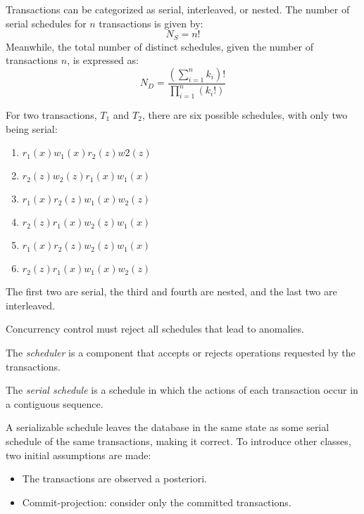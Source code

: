 Transactions can be categorized as serial, interleaved, or nested. 
The number of serial schedules for $n$ transactions is given by:
\[N_S=n!\]
Meanwhile, the total number of distinct schedules, given the number of transactions $n$, is expressed as:
\[N_D=\dfrac{\left( \sum_{i=1}^nk_i \right)!}{\prod_{i=1}^n \left( k_i! \right)}\]
\begin{example}
    For two transactions, $T_1$ and $T_2$, there are six possible schedules, with only two being serial:
    \begin{enumerate}
        \item $r_1(x) w_1(x) r_2(z) w2(z)$
        \item $r_2(z) w_2(z) r_1(x) w_1(x)$
        \item $r_1(x) r_2(z) w_1(x) w_2(z)$
        \item $r_2(z) r_1(x) w_2(z) w_1(x)$
        \item $r_1(x) r_2(z) w_2(z) w_1(x)$
        \item $r_2(z) r_1(x) w_1(x) w_2(z)$
    \end{enumerate}
    The first two are serial, the third and fourth are nested, and the last two are interleaved.
\end{example}
Concurrency control must reject all schedules that lead to anomalies.
\begin{definition}
    The \emph{scheduler} is a component that accepts or rejects operations requested by the transactions. 

    The \emph{serial schedule} is a schedule in which the actions of each transaction occur in a contiguous sequence.
\end{definition}
A serializable schedule leaves the database in the same state as some serial schedule of the same transactions, making it correct. 
To introduce other classes, two initial assumptions are made:
\begin{itemize}
    \item The transactions are observed a posteriori. 
    \item Commit-projection: consider only the committed transactions. 
\end{itemize}